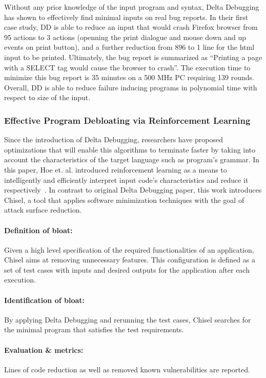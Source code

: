 Without any prior knowledge of the input program and syntax, Delta Debugging has shown to effectively find minimal inputs on real bug reports. In their first case study, DD is able to reduce an input that would crash Firefox browser from 95 actions to 3 actions (openning the print dialogue and mouse down and up events on print button), and a further reduction from 896 to 1 line for the html input to be printed. Ultimately, the bug report is summarized as ``Printing a page with a SELECT tag would cause the browser to crash''. The execution time to minimize this bug report is 35 minutes on a 500 MHz PC requiring 139 rounds. Overall, DD is able to reduce failure inducing programs in polynomial time with respect to size of the input.

\subsubsection{Effective Program Debloating via Reinforcement Learning}
Since the introduction of Delta Debugging, researchers have proposed optimizations that will enable this algorithms to terminate faster by taking into account the characteristics of the target language such as program's grammar. In this paper, Hoe et. al. introduced reinforcement learning as a means to intelligently and efficiently interpret input code's characteristics and reduce it respectively~\cite{heo2018effective}. In contrast to original Delta Debugging paper, this work introduces Chisel, a tool that applies software minimization techniques with the goal of attack surface reduction.

\paragraph{Definition of bloat:} Given a high level specification of the required functionalities of an application, Chisel aims at removing unnecessary features. This configuration is defined as a set of test cases with inputs and desired outputs for the application after each execution.
\paragraph{Identification of bloat:} By applying Delta Debugging and rerunning the test cases, Chisel searches for the minimal program that satisfies the test requirements.
\paragraph{Evaluation \& metrics:} Lines of code reduction as well as removed known vulnerabilities are reported.

